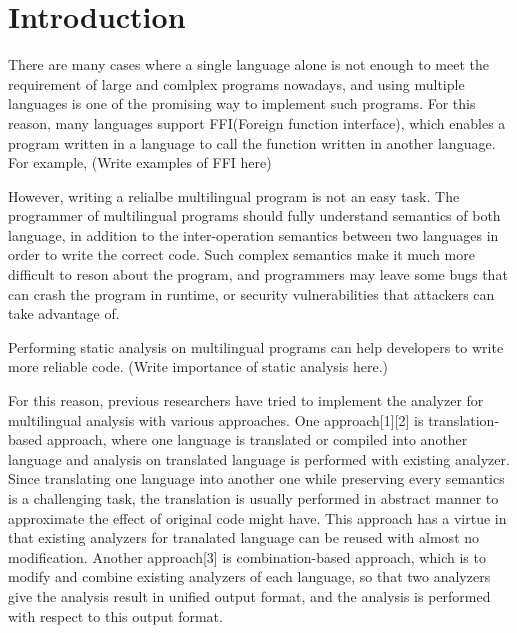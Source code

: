 \section{Introduction}

There are many cases where a single language alone is not enough to meet the
requirement of large and comlplex programs nowadays, and using multiple
languages is one of the promising way to implement such programs. For this
reason, many languages support FFI(Foreign function interface), which enables a
program written in a language to call the function written in another language.
For example, (Write examples of FFI here)

However, writing a relialbe multilingual program is not an easy task. The
programmer of multilingual programs should fully understand semantics of both
language, in addition to the inter-operation semantics between two languages in
order to write the correct code.  Such complex semantics make it much more
difficult to reson about the program, and programmers may leave some bugs that
can crash the program in runtime, or security vulnerabilities that attackers
can take advantage of.

Performing static analysis on multilingual programs can help developers to
write more reliable code. (Write importance of static analysis here.)

For this reason, previous researchers have tried to implement the analyzer for
multilingual analysis with various approaches.  One approach[1][2] is
translation-based approach, where one language is translated or compiled into
another language and analysis on translated language is performed with existing
analyzer. Since translating one language into another one while preserving every
semantics is a challenging task, the translation is usually performed in
abstract manner to approximate the effect of original code might have.
This approach has a virtue in that existing analyzers for tranalated
language can be reused with almost no modification.  Another approach[3] is
combination-based approach, which is to modify and combine existing analyzers
of each language, so that two analyzers give the analysis result in unified
output format, and the analysis is performed with respect to this output
format.

